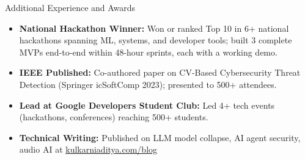 \documentclass[]{mcdowellcv}
\begin{document}
\begin{cvsection}{Additional Experience and Awards}
  \begin{cvsubsection}{}{}{}
    \begin{itemize}
      \item \textbf{National Hackathon Winner:} Won or ranked Top 10 in 6+ national hackathons spanning ML, systems, and developer tools; built 3 complete MVPs end-to-end within 48-hour sprints, each with a working demo.
      \item \textbf{IEEE Published:} Co-authored paper on CV-Based Cybersecurity Threat Detection (Springer icSoftComp 2023); presented to 500+ attendees.
      \item \textbf{Lead at Google Developers Student Club:} Led 4+ tech events (hackathons, conferences) reaching 500+ students.
      \item \textbf{Technical Writing:} Published on LLM model collapse, AI agent security, audio AI at \href{https://www.kulkarniaditya.com/blog}{kulkarniaditya.com/blog}
    \end{itemize}
  \end{cvsubsection}
\end{cvsection}
\end{document}
